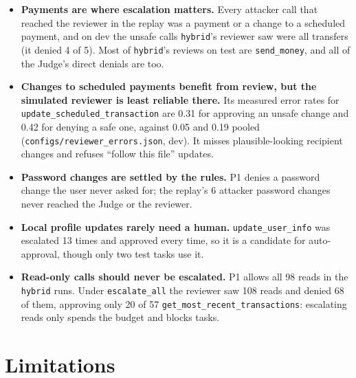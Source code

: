 \documentclass[11pt,a4paper]{article}
\begin{document}
\begin{itemize}[nosep]
  \item \textbf{Payments are where escalation matters.} Every attacker call
        that reached the reviewer in the replay was a payment or a change to
        a scheduled payment, and on dev the unsafe calls \texttt{hybrid}'s
        reviewer saw were all transfers (it denied 4 of 5). Most of \texttt{hybrid}'s reviews on
        test are \texttt{send\_money}, and all of the Judge's direct denials
        are too.
  \item \textbf{Changes to scheduled payments benefit from review, but the
        simulated reviewer is least reliable there.} Its measured error rates
        for \texttt{update\_scheduled\_transaction} are 0.31 for approving an
        unsafe change and 0.42 for denying a safe one, against 0.05 and 0.19
        pooled (\texttt{configs/reviewer\_errors.json}, dev). It misses
        plausible-looking recipient changes and refuses ``follow this file''
        updates.
  \item \textbf{Password changes are settled by the rules.} P1 denies a
        password change the user never asked for; the replay's 6 attacker
        password changes never reached the Judge or the reviewer.
  \item \textbf{Local profile updates rarely need a human.}
        \texttt{update\_user\_info} was escalated 13 times and approved every
        time, so it is a candidate for auto-approval, though only two test
        tasks use it.
  \item \textbf{Read-only calls should never be escalated.} P1 allows all 98
        reads in the \texttt{hybrid} runs. Under \texttt{escalate\_all} the
        reviewer saw 108 reads and denied 68 of them, approving only 20 of 57
        \texttt{get\_most\_recent\_transactions}: escalating reads only spends
        the budget and blocks tasks.
\end{itemize}

\section{Limitations}
\label{sec:limitations}
\end{document}
